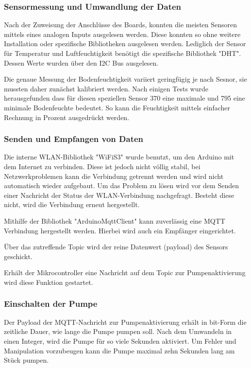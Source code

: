 \subsubsection{Sensormessung und Umwandlung der Daten}
Nach der Zuweisung der Anschlüsse des Boards, konnten die meisten Sensoren mittels eines analogen Inputs ausgelesen werden. Diese konnten so ohne weitere Installation oder spezifische Bibliotheken ausgelesen werden. Lediglich der Sensor für Temperatur und Luftfeuchtigkeit benötigt die spezifische Bibliothek "DHT". Dessen Werte wurden über den I2C Bus ausgelesen.

Die genaue Messung der Bodenfeuchtigkeit variiert geringfügig je nach Sesnor, sie mussten daher zunächst kalibriert werden. Nach einigen Tests wurde herausgefunden dass für diesen speziellen Sensor 370 eine maximale  und 795 eine minimale Bodenfeuchte bedeutet. So kann die Feuchtigkeit mittels einfacher Rechnung in Prozent ausgedrückt werden.

\subsubsection{Senden und Empfangen von Daten}
Die interne WLAN-Bibliothek "WiFiS3" wurde benutzt, um den Arduino mit dem Internet zu verbinden. Diese ist jedoch nicht völlig stabil, bei Netzwerkproblemen kann die Verbindung getrennt werden und wird nicht automatisch wieder aufgebaut. Um das Problem zu lösen wird vor dem Senden einer Nachricht der Status der WLAN-Verbindung nachgefragt. Besteht diese nicht, wird die Verbindung erneut hergestellt.

Mithilfe der Bibliothek "ArduinoMqttClient" kann zuverlässig eine MQTT Verbindung hergestellt werden. Hierbei wird auch ein Empfänger eingerichtet.

Über das zutreffende Topic wird der reine Datenwert (payload) des Sensors geschickt.

Erhält der Mikrocontroller eine Nachricht auf dem Topic zur Pumpenaktivierung wird diese Funktion gestartet.

\subsubsection{Einschalten der Pumpe}
Der Payload der MQTT-Nachricht zur Pumpenaktivierung erhält in bit-Form die zeitliche Dauer, wie lange die Pumpe pumpen soll. Nach dem Umwandeln in einen Integer, wird die Pumpe für so viele Sekunden aktiviert. Um Fehler und Manipulation vorzubeugen kann die Pumpe maximal zehn Sekunden lang am Stück pumpen.

